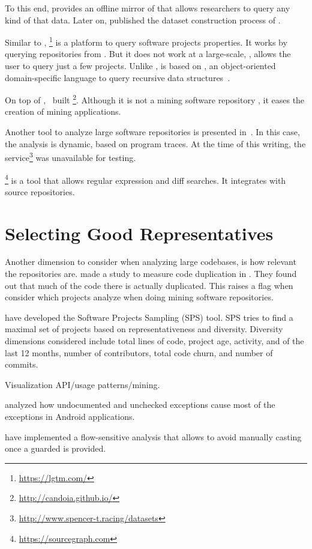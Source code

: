 To this end, \cite{gousiosGHTorentDatasetTool2013} provides an offline mirror of \github{} that allows researchers to query any kind of that data.
Later on, \cite{gousiosLeanGHTorrentGitHub2014} published the dataset construction process of \github{}.

Similar to \boa{}, \lgtm{}\footnote{\url{https://lgtm.com/}} is a platform to query software projects properties.
It works by querying repositories from \github{}.
But it does not work at a large-scale, \ie{}, \lgtm{} allows the user to query just a few projects.
Unlike \boa{}, \lgtm{} is based on \ql{}, an object-oriented domain-specific language to query recursive data structures~\cite{avgustinovQLObjectorientedQueries2016}.

On top of \boa{},~\cite{tiwariCandoiaPlatformBuilding2017} built \candoia \footnote{\url{http://candoia.github.io/}}. 
Although it is not a mining software repository \perse{}, it eases the creation of mining applications. 

Another tool to analyze large software repositories is presented in~\cite{brandauerSpencerInteractiveHeap2017}.
In this case, the analysis is dynamic, based on program traces. 
At the time of this writing, the service\footnote{\url{http://www.spencer-t.racing/datasets}} was unavailable for testing. 

\sourcegraph{}\footnote{\url{https://sourcegraph.com}} is a tool that allows regular expression and diff searches.
It integrates with source repositories.

\cite{bajracharyaSourcererInternetscaleSoftware2009}

\section{Selecting Good Representatives}
\label{sec:rw:selection}

Another dimension to consider when analyzing large codebases, is how relevant the repositories are.
\cite{lopesDeJaVuMapCode2017} made a study to measure code duplication in \github{}.
They found out that much of the code there is actually duplicated.
This raises a flag when consider which projects analyze when doing mining software repositories.

\cite{nagappanDiversitySoftwareEngineering2013} have developed the Software Projects Sampling (SPS) tool.
SPS tries to find a maximal set of projects based on representativeness and diversity.
Diversity dimensions considered include total lines of code, project age, activity, and of the last 12 months, number of contributors, total code churn, and number of commits.

\cite{saiedVisualizationBasedAPI2015} Visualization API/usage
patterns/mining.

\cite{kechagiaUndocumentedUncheckedExceptions2014} analyzed how undocumented and
unchecked exceptions cause most of the exceptions in
Android applications.


\cite{wintherGuardedTypePromotion2011} have implemented a flow-sensitive analysis that allows to avoid manually casting once a guarded  is provided.